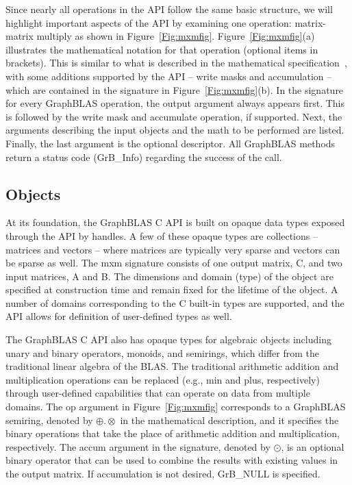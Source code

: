 Since nearly all operations in the API follow the same basic structure, we will
highlight important aspects of the API by examining one operation: matrix-matrix
multiply as shown in Figure~\ref{Fig:mxmfig}.  Figure~\ref{Fig:mxmfig}(a) illustrates
the mathematical notation for that operation (optional items in brackets). This is similar to what is described in the
mathematical specification~\cite{mathgraphblas16}, with some additions supported by the API -- write masks and
accumulation -- which are contained in the signature in Figure~\ref{Fig:mxmfig}(b).
In the signature for every GraphBLAS operation, the output argument always 
appears first. This is followed by the write mask and accumulate operation, if supported. 
Next, the arguments describing the input objects and the math to be performed are
listed. Finally, the last argument is the optional descriptor.  All GraphBLAS methods
return a status code ({\sf GrB\_Info}) regarding the success of the call.

\subsection{Objects}

At its foundation, the GraphBLAS C API is built on opaque data types exposed
through the API by handles.  
A few of these opaque types are collections -- matrices and vectors --
where matrices are typically very sparse and vectors can be
sparse as well.  The {\sf mxm} signature consists of one output matrix, {\sf C}, and 
two input matrices, {\sf A} and {\sf B}. The dimensions and 
domain (type) of the object are specified at construction time and remain fixed for the lifetime of 
the object.  A number of domains corresponding to the C built-in types are
supported, and the API allows for definition of user-defined types as well.

The GraphBLAS C API also has opaque types for algebraic objects including
unary and binary operators, monoids, and semirings, which differ from the traditional
linear algebra of the BLAS.  The traditional arithmetic addition and
multiplication operations can be replaced (e.g., min and plus, respectively) through
user-defined capabilities that can operate on data from multiple domains.  The {\sf op} 
argument in Figure~\ref{Fig:mxmfig} corresponds to a GraphBLAS semiring, denoted by $\oplus.\otimes$ in the 
mathematical description, and it specifies the binary operations that take the 
place of arithmetic addition and multiplication, respectively. The {\sf accum}
argument in the signature, denoted by $\odot$, is an optional binary operator that can
be used to combine the results with existing values in the output matrix. If accumulation
is not desired, {\sf GrB\_NULL} is specified.

